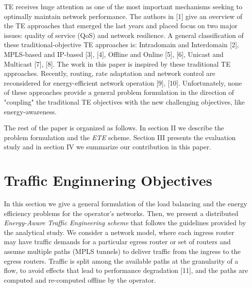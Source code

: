 \documentclass[journal]{IEEEtran}
\begin{document}
TE receives huge attention as one of the most important mechanisms seeking to optimally maintain network performance. The authors in [1] give an overview of the TE approaches that emerged the last years and placed focus on two major issues: quality of service (QoS) and network resilience. A general classification of these traditional-objective TE approaches is: Intradomain and Interdomain [2], MPLS-based and IP-based [3], [4], Offline and Online [5], [6], Unicast and Multicast [7], [8]. The work in this paper is inspired by these traditional TE approaches. Recently, routing, rate adaptation and network control are reconsidered for energy-efficient network operation [9], [10]. Unfortunately, none of these approaches provide a general problem formulation in the direction of "coupling" the traditional TE objectives with the new challenging objectives, like energy-awareness.

The rest of the paper is organized as follows. In section II we describe the problem formulation and the \emph{ETE} scheme. Section III presents the evaluation study and in section IV we summarize our contribution in this paper.


















\section{Traffic Enginnering Objectives}
In this section we give a general formulation of the load balancing and the energy efficiency problems for the operator's networks. Then, we present a distributed \emph{Energy-Aware Traffic Engineering scheme} that follows the guidelines provided by the analytical study. We consider a network model, where each ingress router may have traffic demands for a particular egress router or set of routers and assume multiple paths (MPLS tunnels) to deliver traffic from the ingress to the egress routers. Traffic is split among the available paths at the granularity of a flow, to avoid effects that lead to performance degradation [11], and the paths are computed and re-computed offline by the operator.
\end{document}
